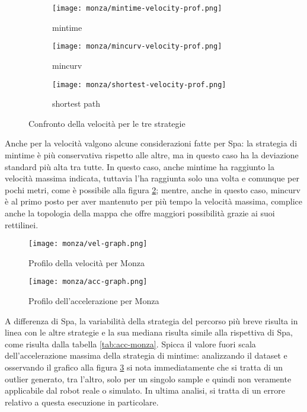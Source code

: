 \begin{figure}
	\begin{center}
	\begin{subfigure}[c]{0.3\textwidth}
		\texttt{[image: monza/mintime-velocity-prof.png]}
		\caption{mintime}
	\end{subfigure}
	\begin{subfigure}[c]{0.3\textwidth}
		\texttt{[image: monza/mincurv-velocity-prof.png]}
		\caption{mincurv}
	\end{subfigure}
	\begin{subfigure}[c]{0.365\textwidth}
		\texttt{[image: monza/shortest-velocity-prof.png]}
		\caption{shortest path}
	\end{subfigure}
		\caption{Confronto della velocità per le tre strategie}
		\label{fig:monza-vel-comparison}
	\end{center}
\end{figure}
Anche per la velocità valgono alcune considerazioni fatte per Spa: la strategia di mintime è più
conservativa rispetto alle altre, ma in questo caso ha la deviazione standard più alta tra tutte.
In questo caso, anche mintime ha raggiunto la velocità massima indicata, tuttavia l'ha raggiunta solo una
volta e comunque per pochi metri, come è possibile alla figura \ref{fig:speed-graph-monza}; mentre,
anche in questo caso, mincurv è al primo posto per aver mantenuto per più tempo la velocità massima,
complice anche la topologia della mappa che offre maggiori possibilità grazie ai suoi rettilinei.
\begin{figure}[H]
	\begin{center}
		\texttt{[image: monza/vel-graph.png]}
	\end{center}
	\caption{Profilo della velocità per Monza}
	\label{fig:speed-graph-monza}
\end{figure}
\begin{figure}[H]
	\begin{center}
		\texttt{[image: monza/acc-graph.png]}
	\end{center}
	\caption{Profilo dell'accelerazione per Monza}
	\label{fig:acc-graph-monza}
\end{figure}
A differenza di Spa, la variabilità della strategia del percorso più breve risulta in linea con le altre
strategie e la sua mediana risulta simile alla rispettiva di Spa, come risulta dalla tabella
\ref{tab:acc-monza}. Spicca il valore fuori scala dell'accelerazione massima della strategia di mintime:
analizzando il dataset e osservando il grafico alla figura \ref{fig:acc-graph-monza} si nota
immediatamente che si tratta di un outlier generato, tra l'altro, solo per un singolo sample e quindi non
veramente applicabile dal robot reale o simulato. In ultima analisi, si tratta di un errore relativo a
questa esecuzione in particolare.

